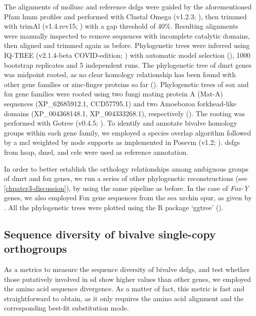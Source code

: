 The alignments of mollusc and reference \glspl{dsfg} were guided by the aforementioned Pfam \gls{hmm} profiles and performed with Clustal Omega (v1.2.3; ), then trimmed with trimAl (v1.4.rev15; ) with a gap threshold of 40\%. Resulting alignments were manually inspected to remove sequences with incomplete catalytic domains, then aligned and trimmed again as before. Phylogenetic trees were inferred using IQ-TREE (v2.1.4-beta COVID-edition; ) with automatic model selection (), 1000 bootstrap replicates and 5 independent runs. The phylogenetic tree of \gls{dmrt} genes was midpoint rooted, as no clear homology relationship has been found with other gene families or zinc-finger proteins so far (). Phylogenetic trees of \gls{sox} and \gls{fox} gene families were rooted using two fungi mating protein A (Mat-A) sequences (XP\_62685912.1, CCD57795.1) and two Amoebozoa forkhead-like domains (XP\_004368148.1, XP\_004333268.1), respectively (). The rooting was performed with Gotree (v0.4.5; ). To identify and annotate bivalve homology groups within each gene family, we employed a species overlap algorithm followed by a \gls{mcl} weighted by node supports as implemented in Possvm (v1.2; ). \glspl{dsfg} from \gls{hsap}, \gls{dmel}, and \gls{cele} were used as reference annotation.

In order to better establish the orthology relationships among ambiguous groups of \gls{dmrt} and \gls{fox} genes, we run a series of other phylogenetic reconstructions (see \cref{chpater3-discussion}), by using the same pipeline as before. In the case of \textit{Fox-Y} genes, we also employed Fox gene sequences from the sea urchin \gls{spur}, as given by . All the phylogenetic trees were plotted using the R package ‘ggtree’ ().

\subsection{Sequence diversity of bivalve single-copy orthogroups}
As a metrics to measure the sequence diversity of bivalve \glspl{dsfg}, and test whether those putatively involved in \gls{sd} show higher values than other genes, we employed the amino acid sequence divergence. As a matter of fact, this metric is fast and straightforward to obtain, as it only requires the amino acid alignment and the corresponding best-fit substitution mode.

